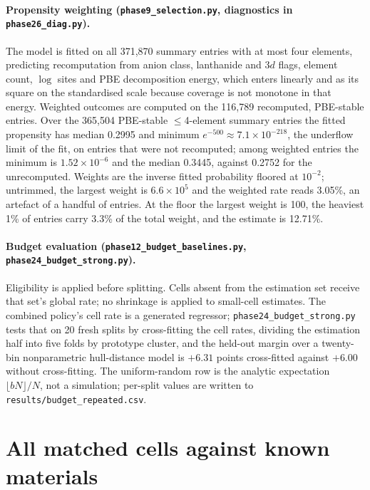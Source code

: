 \documentclass[11pt]{article}
\begin{document}
\paragraph{Propensity weighting (\texttt{phase9\_selection.py}, diagnostics in
\texttt{phase26\_diag.py}).} The model is fitted on all 371{,}870 summary entries with at
most four elements, predicting recomputation from anion class, lanthanide and 3$d$
flags, element count, $\log$ sites and PBE decomposition energy, which enters linearly
and as its square on the standardised scale because coverage is not monotone in that
energy. Weighted outcomes are computed on the 116{,}789 recomputed, PBE-stable entries.
Over the 365{,}504 PBE-stable $\le$4-element summary entries the fitted propensity has
median 0.2995 and minimum
$e^{-500} \approx 7.1\times10^{-218}$, the underflow limit of the fit, on entries that were not recomputed; among weighted entries the
minimum is $1.52\times10^{-6}$ and the median 0.3445, against 0.2752 for the
unrecomputed. Weights are the inverse fitted probability floored at $10^{-2}$; untrimmed,
the largest weight is $6.6\times10^{5}$ and the weighted rate reads 3.05\%, an artefact
of a handful of entries. At the floor the largest weight is 100, the heaviest 1\% of
entries carry 3.3\% of the total weight, and the estimate is 12.71\%.

\paragraph{Budget evaluation (\texttt{phase12\_budget\_baselines.py},
\texttt{phase24\_budget\_strong.py}).} Eligibility is applied before splitting. Cells
absent from the estimation set receive that set's global rate; no shrinkage is applied
to small-cell estimates. The combined policy's cell rate is a generated regressor;
\texttt{phase24\_budget\_strong.py} tests that on 20 fresh splits by cross-fitting the
cell rates, dividing the estimation half into five folds by prototype cluster, and the
held-out margin over a twenty-bin nonparametric hull-distance model is $+6.31$ points
cross-fitted against $+6.00$ without cross-fitting. The uniform-random row is the analytic expectation
$\lfloor bN \rfloor / N$, not a simulation; per-split values are written to
\texttt{results/budget\_repeated.csv}.

\section{All matched cells against known materials}\label{app:allcells}
\end{document}
